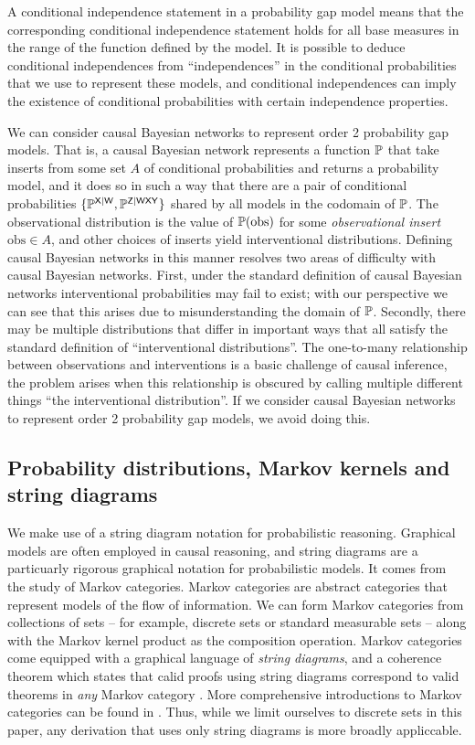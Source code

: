 A conditional independence statement in a probability gap model means that the corresponding conditional independence statement holds for all base measures in the range of the function defined by the model. It is possible to deduce conditional independences from ``independences'' in the conditional probabilities that we use to represent these models, and conditional independences can imply the existence of conditional probabilities with certain independence properties.

We can consider causal Bayesian networks to represent order 2 probability gap models. That is, a causal Bayesian network represents a function $\mathbb{P}$ that take inserts from some set $A$ of conditional probabilities and returns a probability model, and it does so in such a way that there are a pair of conditional probabilities $\{\mathbb{P}^{\mathsf{X}|\mathsf{W}},\mathbb{P}^{\mathsf{Z}|\mathsf{WXY}}\}$ shared by all models in the codomain of $\mathbb{P}$. The observational distribution is the value of $\mathbb{P}(\text{obs})$ for some \emph{observational insert} $\text{obs}\in A$, and other choices of inserts yield interventional distributions. Defining causal Bayesian networks in this manner resolves two areas of difficulty with causal Bayesian networks. First, under the standard definition of causal Bayesian networks interventional probabilities may fail to exist; with our perspective we can see that this arises due to misunderstanding the domain of $\mathbb{P}$. Secondly, there may be multiple distributions that differ in important ways that all satisfy the standard definition of ``interventional distributions''. The one-to-many relationship between observations and interventions is a basic challenge of causal inference, the problem arises when this relationship is obscured by calling multiple different things ``the interventional distribution''. If we consider causal Bayesian networks to represent order 2 probability gap models, we avoid doing this. 


\subsection{Probability distributions, Markov kernels and string diagrams}

We make use of a string diagram notation for probabilistic reasoning. Graphical models are often employed in causal reasoning, and string diagrams are a particuarly rigorous graphical notation for probabilistic models. It comes from the study of Markov categories. Markov categories are abstract categories that represent models of the flow of information. We can form Markov categories from collections of sets -- for example, discrete sets or standard measurable sets -- along with the Markov kernel product as the composition operation. Markov categories come equipped with a graphical language of \emph{string diagrams}, and a coherence theorem which states that calid proofs using string diagrams correspond to valid theorems in \emph{any} Markov category \citep{selinger_survey_2010}. More comprehensive introductions to Markov categories can be found in \citet{fritz_synthetic_2020,cho_disintegration_2019}. Thus, while we limit ourselves to discrete sets in this paper, any derivation that uses only string diagrams is more broadly appliccable.

